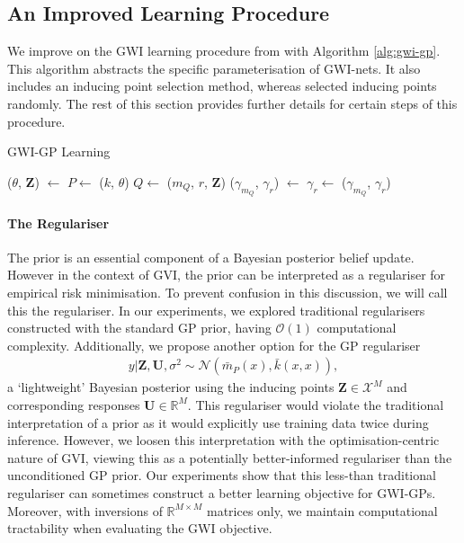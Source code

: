 \documentclass{article}
\numberwithin{equation}{section}
\begin{document}
\subsection{An Improved Learning Procedure}
We improve on the GWI learning procedure from \cite{wild2022generalized} with Algorithm \ref{alg:gwi-gp}.
This algorithm abstracts the specific parameterisation of GWI-nets. 
It also includes an inducing point selection method, whereas \cite{wild2022generalized} selected inducing points randomly.
The rest of this section provides further details for certain steps of this procedure.
\begin{algorithm}[h!]
\caption{GWI-GP Learning}\label{alg:gwi-gp}
\begin{algorithmic}
     
    \State ($\theta$, $\mathbf{Z}$) $\leftarrow$  
    \State $P \leftarrow$ ($k$, $\theta$) 
    \State $Q \leftarrow$ ($m_Q$, $r$, $\mathbf{Z}$) 
    \State ($\gamma_{m_Q}$, $\gamma_r$) $\leftarrow$  
    \State $\gamma_r \leftarrow$  
    \State \Return ($\gamma_{m_Q}$, $\gamma_r$)
\end{algorithmic}
\end{algorithm}
\paragraph{The Regulariser} The prior is an essential component of a Bayesian posterior belief update.
However in the context of GVI, the prior can be interpreted as a regulariser for empirical risk minimisation.
To prevent confusion in this discussion, we will call this the regulariser. 
In our experiments, we explored traditional regularisers constructed with the standard GP prior, having $\mathcal{O}(1)$ computational complexity. 
Additionally, we propose another option for the GP regulariser
\begin{align}
    y \vert \mathbf{Z}, \mathbf{U}, \sigma^2
    \sim \mathcal{N}\left(\bar{m}_P(x), \bar{k}(x, x)\right),
    \label{gp-posterior-regulariser}
\end{align}
a `lightweight' Bayesian posterior using the inducing points $\mathbf{Z}\in \mathcal{X}^M$ and corresponding responses $\mathbf{U} \in \mathbb{R}^M$.
This regulariser would violate the traditional interpretation of a prior as it would explicitly use training data twice during inference.
However, we loosen this interpretation with the optimisation-centric nature of GVI, viewing this as a potentially better-informed regulariser than the unconditioned GP prior.
Our experiments show that this less-than traditional regulariser can sometimes construct a better learning objective for GWI-GPs.
Moreover, with inversions of $\mathbb{R}^{M\times M}$ matrices only, we maintain computational tractability when evaluating the GWI objective.
\newpage
\end{document}
